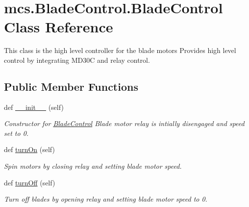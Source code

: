 \hypertarget{classmcs_1_1BladeControl_1_1BladeControl}{}\section{mcs.\+Blade\+Control.\+Blade\+Control Class Reference}
\label{classmcs_1_1BladeControl_1_1BladeControl}


This class is the high level controller for the blade motors Provides high level control by integrating M\+D30C and relay control.  


\subsection*{Public Member Functions}
\begin{DoxyCompactItemize}
\item 
def \hyperlink{classmcs_1_1BladeControl_1_1BladeControl_a37cb8ac7467a1274d14e267d6435d3e8}{\+\_\+\+\_\+init\+\_\+\+\_\+} (self)
\begin{DoxyCompactList}\small\item\em Constructor for \hyperlink{classmcs_1_1BladeControl_1_1BladeControl}{Blade\+Control} Blade motor relay is intially disengaged and speed set to 0. \end{DoxyCompactList}\item 
\mbox{\label{classmcs_1_1BladeControl_1_1BladeControl_a05859a242acdf999ed8903a9e93fe8ca}} 
def \hyperlink{classmcs_1_1BladeControl_1_1BladeControl_a05859a242acdf999ed8903a9e93fe8ca}{turn\+On} (self)
\begin{DoxyCompactList}\small\item\em Spin motors by closing relay and setting blade motor speed. \end{DoxyCompactList}\item 
\mbox{\label{classmcs_1_1BladeControl_1_1BladeControl_a40b66a4f484600964f36b7f220e3d779}} 
def \hyperlink{classmcs_1_1BladeControl_1_1BladeControl_a40b66a4f484600964f36b7f220e3d779}{turn\+Off} (self)
\begin{DoxyCompactList}\small\item\em Turn off blades by opening relay and setting blade motor speed to 0. \end{DoxyCompactList}\end{DoxyCompactItemize}
